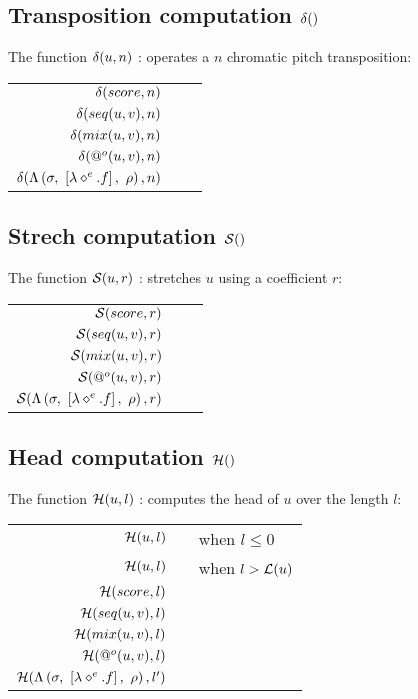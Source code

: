 \documentclass[10pt,a4paper,frenchb]{article}
\makeatletter
\newcommand{\evaltable}[1][$\rightarrow$]	  {\begin{center} \begin{tabular*}{\linewidth}{rc@{ #1 }l}}
\newcommand{\evaltablend}  		{\end{tabular*}\end{center}}
\makeatother
\begin{document}
\subsection{Transposition computation $\delta()$}
The function $\delta(u,n)$ :   operates a $n$ chromatic pitch transposition:

\evaltable
 \hline
 $\delta(score,n)$				& & \transpScore{score}{n} \\
 $\delta(seq(u, v),n)$		& & \transpSeq{u}{v}{n} \\
 $\delta(mix(u, v),n)$ 		& & \transpMix{u}{v}{n} \\
 $\delta(@^o (u,v),n)$ 	& & \transpApply{u}{v}{n} \\
 $\delta(\Lambda\left(\sigma,\ \left[\lambda \diamond^e.f\right],\ \rho \right),n)$ 	& & \transpClosure{e}{f}{\bounds}{n} \\
 \hline
\evaltablend

\subsection{Strech computation $\mathcal S()$}
The function $\mathcal S(u,r)$ :   stretches $u$ using a coefficient $r$:

\evaltable
 \hline
 $\mathcal S(score,r)$					& & \stretchScore{score}{r} \\
 $\mathcal S(seq(u, v),r)$			& & \stretchSeq{u}{v}{r} \\
 $\mathcal S(mix(u, v),r)$ 			& & \stretchMix{u}{v}{r} \\
 $\mathcal S(@^o (u,v),r)$ 		& & \stretchApply{u}{v}{r} \\
 $\mathcal S(\Lambda\left(\sigma,\ \left[\lambda \diamond^e.f\right],\ \rho \right),r)$ 	& & \stretchClosure{e}{f}{\bounds}{r} \\
 \hline
\evaltablend

\subsection{Head computation $\mathcal H()$}
The function $\mathcal H(u,l)$ :   computes the head of $u$ over the length $l$:

\evaltable
 \hline
 $\mathcal H(u,l)$						& & \emptyScore \: when $l \leq 0$ \\
 $\mathcal H(u,l)$						& & \identity{u} \: when $l > \mathcal L(u)$ \\
 $\mathcal H(score,l)$					& & \headScore{score}{l} \\
 $\mathcal H(seq(u, v),l)$			& & \headSeq{u}{v}{l} \\
 $\mathcal H(mix(u, v),l)$ 			& & \headMix{u}{v}{l} \\
 $\mathcal H(@^o (u,v),l)$ 		& & \headApply{u}{v}{l} \\
 $\mathcal H(\Lambda\left(\sigma,\ \left[\lambda \diamond^e.f\right],\ \rho \right),l')$ 	& & \headClosure{e}{f}{\bounds}{l'} \\
 \hline
\evaltablend
\end{document}
